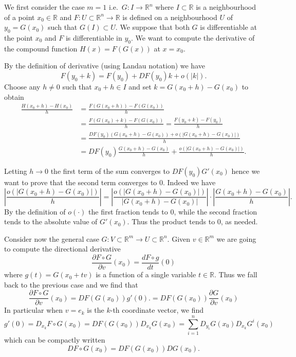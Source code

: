 \documentclass[12pt]{article}
\newcommand{\R}{\mathbb R}
\theoremstyle{remark}
\begin{document}
We first consider the case $m=1$ i.e.\ $G\colon I\to \R^n$ where $I\subset \R$ is a neighbourhood of a point $x_0\in \R$ and $F\colon U\subset \R^n\to \R$ is defined on a neighbourhood $U$ of $y_0=G(x_0)$ such that $G(I)\subset U$. We suppose that both $G$ is differentiable at the point $x_0$ and $F$ is differentiable in $y_0$. We want to compute the derivative of the compound
function $H(x)=F(G(x))$ at $x=x_0$.

By the definition of derivative (using Landau notation) we have
\[
  F(y_0+ k) = F(y_0) + DF(y_0) k + o(|k|).
\]
Choose any $h\neq 0$ such that $x_0+h\in I$ and set $k=G(x_0+h)-G(x_0)$ to obtain
\begin{align*}
\frac{H(x_0+h)-H(x_0)}{h} &=
\frac{F(G(x_0+h))-F(G(x_0))}{h}\\
&=\frac{F(G(x_0)+k)-F(G(x_0))}{h} = \frac{F(y_0+k)-F(y_0)}{h}\\
&=\frac{DF(y_0) (G(x_0+h)-G(x_0)) + o(|G(x_0+h)-G(x_0)|)}{h}\\
&=DF(y_0) \frac{G(x_0 + h) -G(x_0)}{h} +\frac{o(|G(x_0+h)-G(x_0)|)}{h}.
\end{align*}

Letting $h\to 0$ the first term of the sum converges to $DF(y_0) G'(x_0)$ hence 
we want to prove that the second term converges to $0$.
Indeed we have
\[
  \left|\frac{o(|G(x_0+h)-G(x_0)|)}{h}\right|
 =\left|\frac{o(|G(x_0+h)-G(x_0)|)}{|G(x_0+h)-G(x_0)|}\right|\cdot
  \left|\frac{G(x_0+h)-G(x_0)}{h}\right|.
\]
By the definition of $o(\cdot)$ the first fraction tends to $0$, while 
the second fraction tends to the absolute value of $G'(x_0)$. Thus the product
tends to $0$, as needed.

Consider now the general case $G\colon V\subset \R^m\to U\subset \R^n$.
Given $v\in \R^m$ we are going to compute the directional derivative
\[
\frac{\partial F\circ G}{\partial v} (x_0) = \frac{d F\circ g}{dt} (0)
\]
where $g(t)=G(x_0+tv)$ is a function of a single variable $t\in\R$. Thus
we fall back to the previous case and we find that 
\[
\frac{\partial F\circ G}{\partial v} (x_0) = DF(G(x_0)) g'(0).
= DF(G(x_0)) \frac{\partial G}{\partial v} (x_0)
\]
In particular when $v=e_k$ is the $k$-th coordinate vector, we find
\[
g'(0) = 
 D_{x_k} F \circ G (x_0) = DF(G(x_0)) D_{x_k} G(x_0)
= \sum_{i=1}^n D_{y_i} G(x_0) D_{x_k} G^i(x_0)
\]
which can be compactly written
\[
  D F \circ G(x_0) = DF(G(x_0)) DG(x_0).
\]

\end{document}

